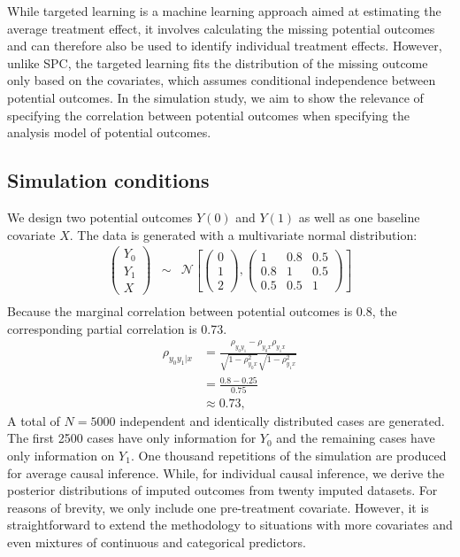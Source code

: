 	While targeted learning is a machine learning approach aimed at estimating the average treatment effect, it involves calculating the missing potential outcomes and can therefore also be used to identify individual treatment effects. However, unlike SPC, the targeted learning fits the distribution of the missing outcome only based on the covariates, which assumes conditional independence between potential outcomes. In the simulation study, we aim to show the relevance of specifying the correlation between potential outcomes when specifying the analysis model of potential outcomes.              
	\subsection{Simulation conditions}
	\label{sec:4.5.1}
	We design two potential outcomes $Y(0)$ and $Y(1)$ as well as one baseline covariate $X$. The data is generated with a multivariate normal distribution:
	\begin{eqnarray*}
		\begin{pmatrix}Y_{0}\\
			Y_{1}\\
			X
		\end{pmatrix} & \sim & \mathcal{N}\left[\left(\begin{array}{c}
			0\\
			1\\
			2
		\end{array}\right),\left(\begin{array}{ccc}
			1 & 0.8 & 0.5\\
			0.8 & 1 & 0.5\\
			0.5 & 0.5 & 1
		\end{array}\right)\right]\\
	\end{eqnarray*}
	Because the marginal correlation between potential outcomes is 0.8, the corresponding partial correlation is 0.73. 
	\begin{equation}
		\begin{array}{cl}
			\rho_{y_{0}y_{1}|x} &= \frac{\rho_{y_{0}y_{1}} - \rho_{y_{0}x}\rho_{y_{1}x}}{\sqrt{1 - \rho_{y_{0}x}^2}\sqrt{1 - \rho_{y_{1}x}^2}} \\
			&= \frac{0.8 - 0.25}{0.75}\\
			&\approx 0.73,
		\end{array}
	\end{equation}
	A total of $N = 5000$ independent and identically distributed cases are generated. The first 2500 cases have only information for $Y_0$ and the remaining cases have only information on $Y_1$. One thousand repetitions of the simulation are produced for average causal inference. While, for individual causal inference, we derive the posterior distributions of imputed outcomes from twenty imputed datasets. For reasons of brevity, we only include one pre-treatment covariate. However, it is straightforward to extend the methodology to situations with more covariates and even mixtures of continuous and categorical predictors.
	    
